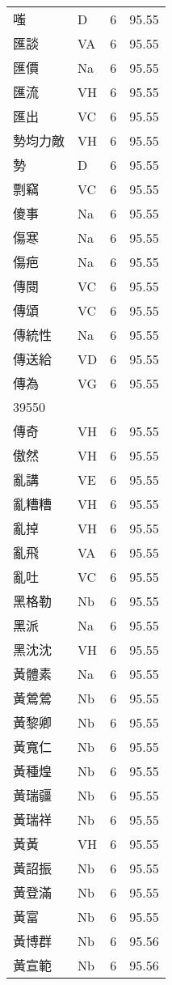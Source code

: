 \documentclass[twocolumn]{book}
\begin{document}
\begin{supertabular}{llrr}
嗤 & D & 6 &  95.55\\
匯談 & VA & 6 &  95.55\\
匯價 & Na & 6 &  95.55\\
匯流 & VH & 6 &  95.55\\
匯出 & VC & 6 &  95.55\\
勢均力敵 & VH & 6 &  95.55\\
勢 & D & 6 &  95.55\\
剽竊 & VC & 6 &  95.55\\
傻事 & Na & 6 &  95.55\\
傷寒 & Na & 6 &  95.55\\
傷疤 & Na & 6 &  95.55\\
傳閱 & VC & 6 &  95.55\\
傳頌 & VC & 6 &  95.55\\
傳統性 & Na & 6 &  95.55\\
傳送給 & VD & 6 &  95.55\\
傳為 & VG & 6 &  95.55\\
39550\\
傳奇 & VH & 6 &  95.55\\
傲然 & VH & 6 &  95.55\\
亂講 & VE & 6 &  95.55\\
亂糟糟 & VH & 6 &  95.55\\
亂掉 & VH & 6 &  95.55\\
亂飛 & VA & 6 &  95.55\\
亂吐 & VC & 6 &  95.55\\
黑格勒 & Nb & 6 &  95.55\\
黑派 & Na & 6 &  95.55\\
黑沈沈 & VH & 6 &  95.55\\
黃體素 & Na & 6 &  95.55\\
黃鶯鶯 & Nb & 6 &  95.55\\
黃黎卿 & Nb & 6 &  95.55\\
黃寬仁 & Nb & 6 &  95.55\\
黃種煌 & Nb & 6 &  95.55\\
黃瑞疆 & Nb & 6 &  95.55\\
黃瑞祥 & Nb & 6 &  95.55\\
黃黃 & VH & 6 &  95.55\\
黃詔振 & Nb & 6 &  95.55\\
黃登滿 & Nb & 6 &  95.55\\
黃富 & Nb & 6 &  95.55\\
黃博群 & Nb & 6 &  95.56\\
黃宣範 & Nb & 6 &  95.56\\

\end{supertabular}
\end{document}
